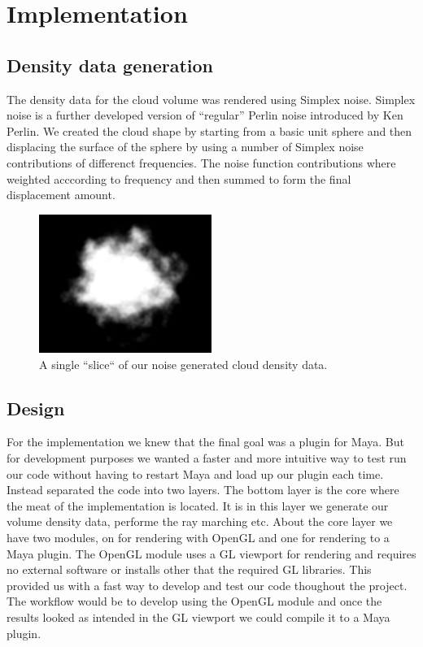 \documentclass[11pt,twocolumn]{article}
\begin{document}
\section{Implementation}
\subsection{Density data generation}
The density data for the cloud volume was rendered using Simplex noise. Simplex noise is a further developed version of ``regular'' Perlin noise introduced by Ken Perlin. We created the cloud shape by starting from a basic unit sphere and then displacing the surface of the sphere by using a number of Simplex noise contributions of differenct frequencies. The noise function contributions where weighted acccording to frequency and then summed to form the final displacement amount.

\begin{figure}[ht]
\includegraphics[width=0.5\textwidth]{figures/cumulus_slice.png}
\caption{A single ``slice`` of our noise generated cloud density data.}
\label{fig:cloud_slice}
\end{figure}

\subsection{Design}
For the implementation we knew that the final goal was a plugin for Maya.
But for development purposes we wanted a faster and more intuitive way to test run our code without having to restart Maya and load up our plugin each time.
Instead separated the code into two layers. The bottom layer is the core where the meat of the implementation is located. It is in this layer we generate our volume density data, performe the ray marching etc. About the core layer we have two modules, on for rendering with OpenGL and one for rendering to a Maya plugin. The OpenGL module uses a GL viewport for rendering and requires no external software or installs other that the required GL libraries. This provided us with a fast way to develop and test our code thoughout the project. The workflow would be to develop using the OpenGL module and once the results looked as intended in the GL viewport we could compile it to a Maya plugin.
\\
\end{document}
